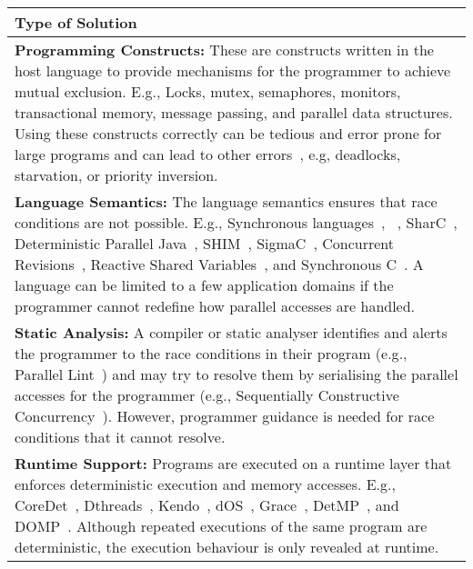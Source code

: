 \begin{table}[t]
	\centering
	\renewcommand{\arraystretch}{1.25}		

	\begin{tabular}{| p{\textwidth} |}
		\hline
		\textbf{Type of Solution}															\\ 
		\hline
		\textbf{Programming Constructs:}
		These are constructs written in the host language to provide mechanisms for the 
		programmer to achieve mutual exclusion. E.g., Locks, mutex, semaphores, monitors, 
		transactional memory, message passing, and parallel data structures. Using these 
		constructs correctly can be tedious and error prone for large programs and can lead to other 
		errors~\cite{multiprocessing_problem_threads,multiprocessing_debugging_concurrency,multiprocessing_debugging_concurrency_study}, 
		e.g, deadlocks, starvation, or priority inversion.									\\ \hline
		
		\textbf{Language Semantics:}
		The language semantics ensures that race conditions are not possible. E.g., Synchronous 
		languages~\cite{timed_synchronous_survey}, \pretc{}~\cite{pret_pretc}, SharC~\cite{multiprocessing_sharc}, 
		Deterministic Parallel Java~\cite{multiprocessing_dpj}, SHIM~\cite{multiprocessing_shim_cell}, 
		SigmaC~\cite{multiprocessing_sigmac}, Concurrent Revisions~\cite{BurckhardtL11}, 
		Reactive Shared Variables~\cite{timed_reactivec_shared_variables}, and Synchronous 
		C~\cite{timed_synccharts_c_proposal}. A language can be limited to a few 
		application domains if the programmer cannot redefine how parallel accesses are
		handled.																			\\ \hline
		
		\textbf{Static Analysis:}
		A compiler or static analyser identifies and alerts the programmer to the race 
		conditions in their program (e.g., Parallel Lint~\cite{parallel_lint}) and may try 
		to resolve them by serialising the parallel accesses for the programmer 
		(e.g., Sequentially Constructive Concurrency~\cite{timed_seq_concurrency}). However, 
		programmer guidance is needed for race conditions that it cannot resolve.			\\ \hline
		
		\textbf{Runtime Support:}
		Programs are executed on a runtime layer that enforces deterministic execution 
		and memory accesses. 
		E.g., CoreDet~\cite{multiprocessing_coredet}, Dthreads~\cite{multiprocessing_dthreads}, 
		Kendo~\cite{multiprocessing_kendo}, dOS~\cite{multiprocessing_dos}, Grace~\cite{multiprocessing_grace}, 
		DetMP~\cite{multiprocessing_detmp}, and DOMP~\cite{multiprocessing_domp}. Although repeated 
		executions of the same program are deterministic, the execution behaviour is only 
		revealed at runtime.																\\ \hline
		

\end{tabular}
\end{table}
